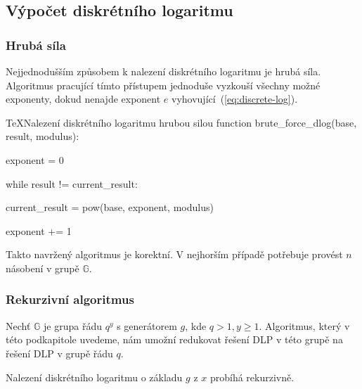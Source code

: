 \documentclass[
  program=infoi,
  biblatex,
  figures=false,
  glossaries,
  index
]{kidiplom}
\begin{document}
    \subsection{Výpočet diskrétního logaritmu}\label{sub:computing-discrete-log}


        \subsubsection{Hrubá síla}\label{subsub:brute-forcing-discrete-log}

            Nejjednodušším způsobem k nalezení diskrétního logaritmu je hrubá síla.
            Algoritmus pracující tímto přístupem jednoduše vyzkouší všechny možné exponenty,
            dokud nenajde exponent $e$ vyhovující~(\ref{eq:discrete-log}).
            
            \begin{kicode}{TeX}{}{Nalezení diskrétního logaritmu hrubou silou}
                function brute_force_dlog(base, result, modulus):

                    exponent = 0

                    while result != current_result:

                        current_result = pow(base, exponent, modulus)
                                        
                        exponent += 1
        
            \end{kicode}

            Takto navržený algoritmus je korektní. V nejhorším případě potřebuje provést $n$ násobení v grupě $\mathbb{G}$.


        \subsubsection{Rekurzivní algoritmus}\label{subsub:recursive-discrete-log}
            
            Nechť $\mathbb{G}$ je grupa řádu $q^y$ s generátorem $g$, kde $q > 1, y \geq 1$.
            Algoritmus, který v této podkapitole uvedeme, nám umožní redukovat řešení DLP
            v této grupě na řešení DLP v grupě řádu $q$.

            Nalezení diskrétního logaritmu o základu $g$ z $x$ probíhá rekurzivně.
\end{document}
